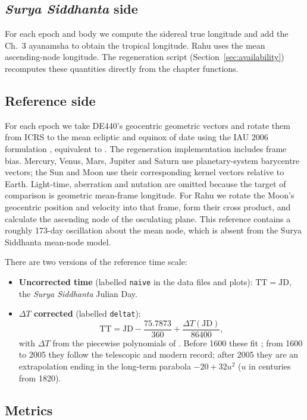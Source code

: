 \documentclass[11pt,a4paper]{article}
\newcommand{\SuSi}{\textit{Surya Siddhanta}}
\newcommand{\dT}{$\Delta T$}
\newcommand{\file}[1]{\texttt{#1}}
\begin{document}
\subsection{\textit{Surya Siddhanta} side}

For each epoch and body we compute the sidereal true longitude and add the Ch.~3 ayanamsha to obtain the tropical longitude. Rahu uses the mean ascending-node longitude. The regeneration script (Section~\ref{sec:availability}) recomputes these quantities directly from the chapter functions.

\subsection{Reference side}
\label{sec:reference}

For each epoch we take DE440's geocentric geometric vectors and rotate them from ICRS to the mean ecliptic and equinox of date using the IAU 2006 formulation \citep{capitaine2003,hilton2006}, equivalent to . The regeneration implementation includes frame bias. Mercury, Venus, Mars, Jupiter and Saturn use planetary-system barycentre vectors; the Sun and Moon use their corresponding kernel vectors relative to Earth. Light-time, aberration and nutation are omitted because the target of comparison is geometric mean-frame longitude. For Rahu we rotate the Moon's geocentric position and velocity into that frame, form their cross product, and calculate the ascending node of the osculating plane. This reference contains a roughly 173-day oscillation about the mean node, which is absent from the Surya Siddhanta mean-node model.

There are two versions of the reference time scale:
\begin{itemize}
  \item \textbf{Uncorrected time} (labelled \file{naive} in the data files and plots): $\mathrm{TT} = \mathrm{JD}$, the \SuSi{} Julian Day.
  \item \textbf{\dT{} corrected} (labelled \file{deltat}):
  \[
    \mathrm{TT} = \mathrm{JD} - \frac{75.7873}{360} + \frac{\Delta T(\mathrm{JD})}{86400},
  \]
  with \dT{} from the piecewise polynomials of \citet{espenak2006}. Before 1600 these fit \citet{morrison2004}; from 1600 to 2005 they follow the telescopic and modern record; after 2005 they are an extrapolation ending in the long-term parabola $-20 + 32u^2$ ($u$ in centuries from 1820).
\end{itemize}

\subsection{Metrics}
\label{sec:metrics}
\end{document}
